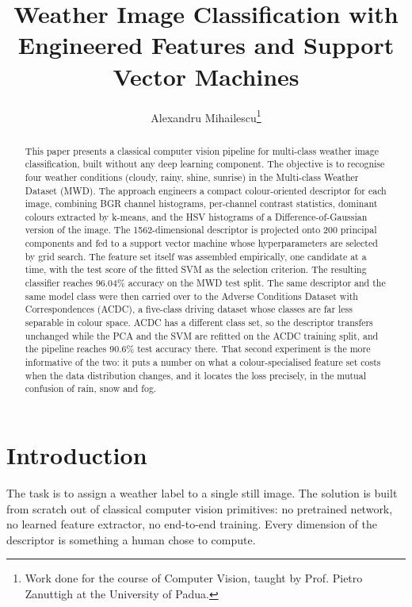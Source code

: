 \documentclass[10pt, conference, letterpaper]{IEEEtran}
\begin{document}
\title{Weather Image Classification with Engineered Features and Support Vector Machines}
\author{Alexandru Mihailescu\thanks{Work done for the course of Computer Vision, taught by Prof. Pietro Zanuttigh at the University of Padua.}}

\maketitle

\begin{abstract}
This paper presents a classical computer vision pipeline for multi-class weather image classification, built without any deep learning component. The objective is to recognise four weather conditions (cloudy, rainy, shine, sunrise) in the Multi-class Weather Dataset (MWD). The approach engineers a compact colour-oriented descriptor for each image, combining BGR channel histograms, per-channel contrast statistics, dominant colours extracted by k-means, and the HSV histograms of a Difference-of-Gaussian version of the image. The 1562-dimensional descriptor is projected onto 200 principal components and fed to a support vector machine whose hyperparameters are selected by grid search. The feature set itself was assembled empirically, one candidate at a time, with the test score of the fitted SVM as the selection criterion. The resulting classifier reaches 96.04\% accuracy on the MWD test split. The same descriptor and the same model class were then carried over to the Adverse Conditions Dataset with Correspondences (ACDC), a five-class driving dataset whose classes are far less separable in colour space. ACDC has a different class set, so the descriptor transfers unchanged while the PCA and the SVM are refitted on the ACDC training split, and the pipeline reaches 90.6\% test accuracy there. That second experiment is the more informative of the two: it puts a number on what a colour-specialised feature set costs when the data distribution changes, and it locates the loss precisely, in the mutual confusion of rain, snow and fog.
\end{abstract}

\section{Introduction}

The task is to assign a weather label to a single still image. The solution is built from scratch out of classical computer vision primitives: no pretrained network, no learned feature extractor, no end-to-end training. Every dimension of the descriptor is something a human chose to compute.
\end{document}
